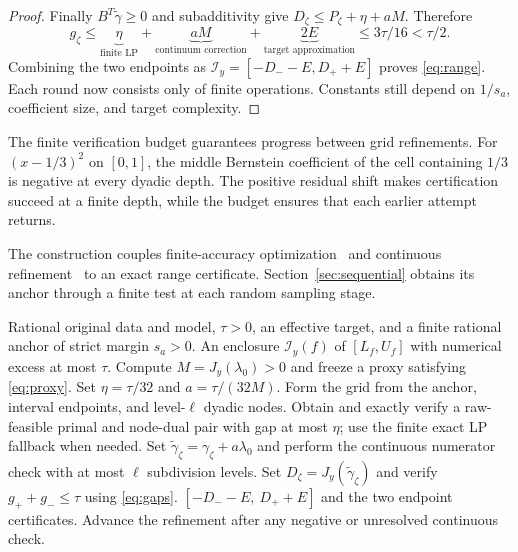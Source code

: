 \documentclass[10pt]{amsart}
\theoremstyle{definition}
\theoremstyle{remark}
\begin{document}
\begin{proof}
Finally $B^T\widetilde\gamma\ge0$ and subadditivity give $D_\zeta\le P_\zeta+\eta+aM$. Therefore
\begin{equation}\label{eq:threebudget}
 g_\zeta\le
 \underbrace{\eta}_{\text{finite LP}}
 +\underbrace{aM}_{\text{continuum correction}}
 +\underbrace{2E}_{\text{target approximation}}
 \le 3\tau/16<\tau/2.
\end{equation}
Combining the two endpoints as $\mathcal I_y=[-D_--E,D_++E]$ proves \eqref{eq:range}. Each round now consists only of finite operations. Constants still depend on $1/s_a$, coefficient size, and target complexity.
\end{proof}

The finite verification budget guarantees progress between grid refinements. For $(x-1/3)^2$ on $[0,1]$, the middle Bernstein coefficient of the cell containing $1/3$ is negative at every dyadic depth. The positive residual shift makes certification succeed at a finite depth, while the budget ensures that each earlier attempt returns.

The construction couples finite-accuracy optimization~\cite{schmid} and continuous refinement~\cite{grid} to an exact range certificate. Section~\ref{sec:sequential} obtains its anchor through a finite test at each random sampling stage.


\begin{algorithm}[tb]
\caption{Certified continuous-range refinement}\label{alg:range}
\begin{algorithmic}[1]
\Require Rational original data and model, $\tau>0$, an effective target, and a finite rational anchor of strict margin $s_a>0$.
\Ensure An enclosure $\mathcal I_y(f)$ of $[L_f,U_f]$ with numerical excess at most $\tau$.
\State Compute $M=J_y(\lambda_0)>0$ and freeze a proxy satisfying \eqref{eq:proxy}.
\State Set $\eta=\tau/32$ and $a=\tau/(32M)$.
  \State Form the grid from the anchor, interval endpoints, and level-$\ell$ dyadic nodes.
    \State Obtain and exactly verify a raw-feasible primal and node-dual pair with gap at most $\eta$; use the finite exact LP fallback when needed.
    \State Set $\widetilde\gamma_\zeta=\gamma_\zeta+a\lambda_0$ and perform the continuous numerator check with at most $\ell$ subdivision levels.
  \EndFor
    \State Set $D_\zeta=J_y(\widetilde\gamma_\zeta)$ and verify $g_++g_-\le\tau$ using \eqref{eq:gaps}.
      \State \Return $[-D_- -E,\ D_+ +E]$ and the two endpoint certificates.
    \EndIf
  \EndIf
  \State Advance the refinement after any negative or unresolved continuous check.
\EndFor
\end{algorithmic}
\end{algorithm}
\end{document}
